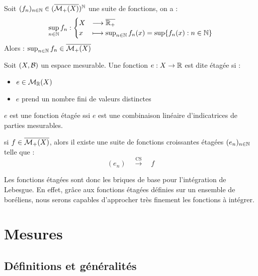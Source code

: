 \begin{theorem}
	Soit $(f_n)_{n\in\mathbb{N}} \in (\overline{\mathcal{M}_+(X)})^{\mathbb{N}}$ une suite de fonctions, on a :
	\[ \sup_{n\in\mathbb{N}} f_n : 
		\begin{cases}
			X &\longrightarrow \overline{\mathbb{R}_+} \\
			x &\longmapsto \sup_{n\in\mathbb{N}} f_n(x) = \sup \{ f_n(x) : n \in \mathbb{N} \}
		\end{cases} \]
Alors :  $\sup_{n\in\mathbb{N}} f_n \in \overline{\mathcal{M}_+(X)}$
\end{theorem}

\begin{definition}
	Soit $(X,\mathcal{B})$ un espace mesurable. Une fonction $e : X \rightarrow \mathbb{R}$ est dite étagée si :
		\begin{itemize}
			\item $e \in \mathcal{M}_{\mathbb{R}}(X)$
			\item $e$ prend un nombre fini de valeurs distinctes 
		\end{itemize}
\end{definition}

\begin{prop}
	$e$ est une fonction étagée ssi $e$ est une combinaison linéaire d'indicatrices de parties mesurables.
\end{prop}

\begin{theorem}
	si $f \in \overline{\mathcal{M}_+(X)}$, alors il existe une suite de fonctions croissantes étagées $(e_n)_{n\in\mathbb{N}}$ telle que :
		\[ \boxed{ (e_n) \quad \overset{\text{CS}}{\longrightarrow} \quad f} \] 
\end{theorem}

Les fonctions étagées sont donc les briques de base pour l'intégration de Lebesgue. En effet, grâce aux fonctions étagées 
définies sur un ensemble de boréliens, nous serons capables d'approcher très finement les fonctions à intégrer. 



\section{Mesures}

\subsection{Définitions et généralités}

